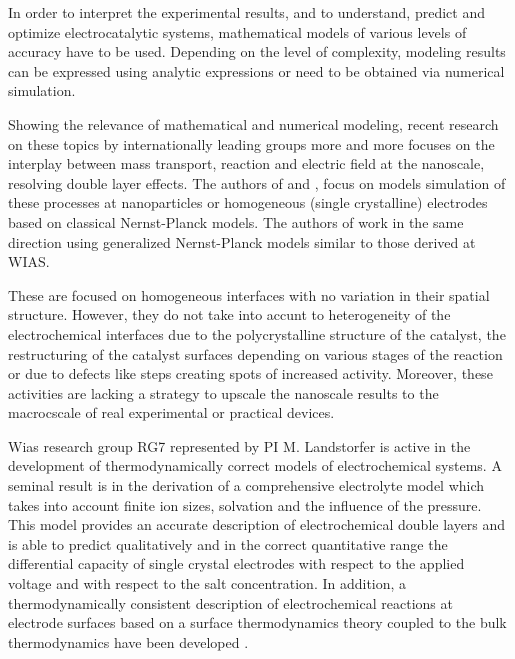 \documentclass[a4paper,10pt]{article}
\begin{document}
In order  to interpret  the experimental  results, and  to understand,
predict and optimize electrocatalytic  systems, mathematical models of
various  levels of  accuracy have to be used. Depending  on the  level of  complexity,
modeling  results  can  be  expressed using  analytic  expressions  or
need to be obtained via numerical simulation.


Showing the  relevance of mathematical and  numerical modeling, recent
research on  these topics by  internationally leading groups  more and
more focuses  on the  interplay between  mass transport,  reaction and
electric    field    at    the     nanoscale, resolving double layer effects.     The    authors    of
\cite{lin2019understanding}          and         \cite{tan2018double},
\cite{eden2019modeling} focus on models  simulation of these processes
at nanoparticles or homogeneous  (single crystalline) electrodes based
on     classical    Nernst-Planck     models.    The     authors    of
\cite{bohra2019modeling} work in the  same direction using generalized
Nernst-Planck models similar to those derived at WIAS.

These are focused on homogeneous interfaces with no variation in their
spatial  structure. However,  they  do   not  take  into  accunt  to
heterogeneity   of   the   electrochemical  interfaces   due   to   the
polycrystalline structure  of the  catalyst, the restructuring  of the
catalyst surfaces depending  on various stages of the  reaction or due
to defects like steps creating spots of increased activity.
Moreover, these activities are lacking a strategy to upscale the nanoscale
results to the macrocscale of real experimental or practical devices.



Wias research group  RG7 represented by PI M. Landstorfer is active
in the development of thermodynamically correct models of electrochemical systems.
A seminal result is in the derivation of a comprehensive electrolyte model which takes into account finite
ion sizes, solvation and the influence of the pressure.
This model provides an accurate description of electrochemical double
layers  and is  able to  predict qualitatively and in the correct quantitative range the
differential capacity of single crystal electrodes with respect to the applied voltage and
with respect to the salt concentration. In addition,  a thermodynamically consistent
description of electrochemical reactions at electrode surfaces based on a surface thermodynamics
theory coupled to the bulk thermodynamics have been developed
\cite{DGM2013,DGL2014,Landstorfer2016187,landstorfer2017boundary}.
\end{document}
